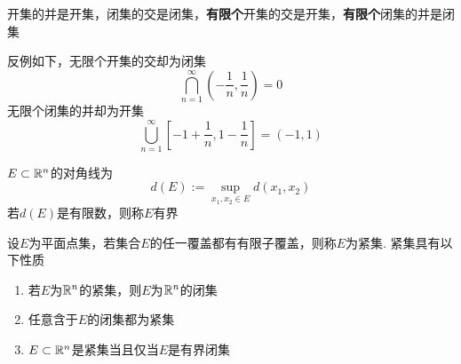 \begin{theorem}
开集的并是开集，闭集的交是闭集，\textbf{有限个}开集的交是开集，\textbf{有限个}闭集的并是闭集
\end{theorem}
反例如下，无限个开集的交却为闭集
\[\bigcap_{n=1}^\infty(-\frac{1}{n},\frac{1}{n})=0\]
无限个闭集的并却为开集
\[\bigcup_{n=1}^\infty[-1+\frac{1}{n},1-\frac{1}{n}]=(-1,1)\]
\begin{definition}[对角线]
$E\subset \mathbb{R}^n$的对角线为
\[d(E):=\sup_{x_1,x_2\in E}d(x_1,x_2)\]
若$d(E)$是有限数，则称$E$有界
\end{definition}
\begin{definition}[紧集]
设$E$为平面点集，若集合$E$的任一覆盖都有有限子覆盖，则称$E$为紧集.
紧集具有以下性质
\begin{enumerate}
	\itemsep -3pt
	\item 若$E$为$\mathbb{R}^n$的紧集，则$E$为$\mathbb{R}^n$的闭集
	\item 任意含于$E$的闭集都为紧集
	\item $E\subset\mathbb{R}^n$是紧集当且仅当$E$是有界闭集
\end{enumerate}
\end{definition}


